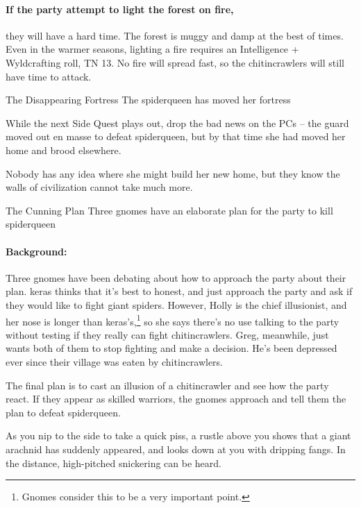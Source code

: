 \begin{multicols}{2}

\paragraph{If the party attempt to light the forest on fire,}
they will have a hard time.
The forest is muggy and damp at the best of times.
Even in the warmer seasons, lighting a fire requires an Intelligence + Wyldcrafting roll, TN 13.
No fire will spread fast, so the chitincrawlers will still have time to attack.

{\squash The Disappearing Fortress}%
{The \gls{spiderqueen} has moved her fortress}%

While the next Side Quest plays out, drop the bad news on the PCs -- the \gls{guard} moved out en masse to defeat \gls{spiderqueen}, but by that time she had moved her home and brood elsewhere.

Nobody has any idea where she might build her new home, but they know the walls of civilization cannot take much more.

{The Cunning Plan}%
{Three gnomes have an elaborate plan for the party to kill \gls{spiderqueen}}%

\paragraph{Background:}
Three gnomes have been debating about how to approach the party about their plan.
\Gls{keras} thinks that it's best to honest, and just approach the party and ask if they would like to fight giant spiders.
However, Holly is the chief illusionist, and her nose is longer than \gls{keras}'s,\footnote{Gnomes consider this to be a very important point.} so she says there's no use talking to the party without testing if they really can fight chitincrawlers.
Greg, meanwhile, just wants both of them to stop fighting and make a decision.
He's been depressed ever since their village was eaten by chitincrawlers.

The final plan is to cast an illusion of a chitincrawler and see how the party react.
If they appear as skilled warriors, the gnomes approach and tell them the plan to defeat \gls{spiderqueen}.

\begin{boxtext}

  As you nip to the side to take a quick piss, a rustle above you shows that a giant arachnid has suddenly appeared, and looks down at you with dripping fangs.
  In the distance, high-pitched snickering can be heard.


\end{boxtext}
\end{multicols}
